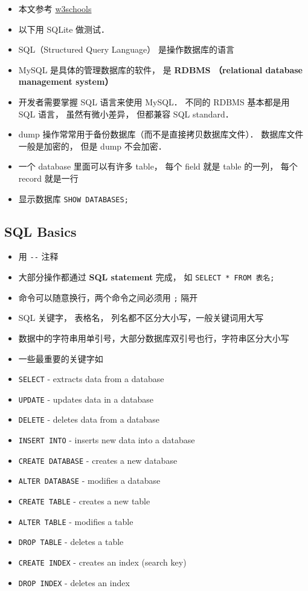 
\begin{issues}
\issueDraft
\end{issues}

\begin{itemize}
\item 本文参考 \href{https://www.w3schools.com/sql/default.asp}{w3schools}
\item 以下用 SQLite 做测试．
\item SQL（Structured Query Language） 是操作数据库的语言
\item MySQL 是具体的管理数据库的软件， 是 \textbf{RDBMS （relational database management system）}
\item 开发者需要掌握 SQL 语言来使用 MySQL． 不同的 RDBMS 基本都是用 SQL 语言， 虽然有微小差异， 但都兼容 SQL standard．
\item dump 操作常常用于备份数据库（而不是直接拷贝数据库文件）． 数据库文件一般是加密的， 但是 dump 不会加密．
\item 一个 database 里面可以有许多 table， 每个 field 就是 table 的一列， 每个 record 就是一行
\item 显示数据库 \verb`SHOW DATABASES;`
\end{itemize}

\subsection{SQL Basics}
\begin{itemize}
\item 用 \verb|--| 注释
\item 大部分操作都通过 \textbf{SQL statement} 完成， 如 \verb`SELECT * FROM 表名;`
\item 命令可以随意换行，两个命令之间必须用 \verb|;| 隔开
\item SQL 关键字， 表格名， 列名都不区分大小写，一般关键词用大写
\item 数据中的字符串用单引号，大部分数据库双引号也行，字符串区分大小写
\item 一些最重要的关键字如
\item \verb`SELECT` - extracts data from a database
\item \verb`UPDATE` - updates data in a database
\item \verb`DELETE` - deletes data from a database
\item \verb`INSERT INTO` - inserts new data into a database
\item \verb`CREATE DATABASE` - creates a new database
\item \verb`ALTER DATABASE` - modifies a database
\item \verb`CREATE TABLE` - creates a new table
\item \verb`ALTER TABLE` - modifies a table
\item \verb`DROP TABLE` - deletes a table
\item \verb`CREATE INDEX` - creates an index (search key)
\item \verb`DROP INDEX` - deletes an index
\end{itemize}

